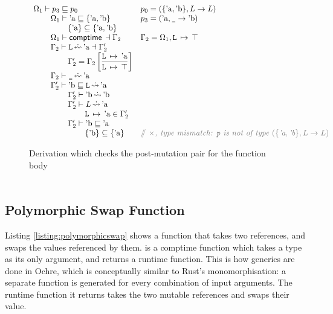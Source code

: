 \documentclass[12pt,twoside]{report}
\begin{document}
\begin{figure}
  \[\begin{array}{ll}
    \Omega_1 \vdash p_3 \subtype p_0 &
      p_0 = (\{\atom{a}, \atom{b}\}, L \rightarrow L) \\
    \otab \Omega_1 \vdash \atom{a} \subtype \{\atom{a}, \atom{b}\} &
      p_3 = (\atom{a}, \mono{\_} \rightarrow \atom{b}) \\
    \otab\otab \{\atom{a}\} \subseteq \{\atom{a}, \atom{b}\} \\
    \otab \Omega_1 \vdash \comptime{} \dashv \Gamma_2 &
      \Gamma_2 = \Omega_1,\absmapm{L}{\top} \\
    \otab \Gamma_2 \vdash \mono{L} \erasedwritearrow \atom{a} \dashv \Gamma_2' \\
    \otab\otab \Gamma_2' = \Gamma_2\left[\dfrac{\absmapm{L}{\atom{a}}}{\absmapm{L}{\top}}\right] \\
    \otab \Gamma_2 \vdash \mono{\_} \erasedwritearrow \atom{a} \\
    \otab \Gamma_2' \vdash \atom{b} \subtype \mono{L} \erasedreadarrow \atom{a} \\
    \otab\otab \Gamma_2' \vdash \atom{b} \erasedreadarrow \atom{b} \\
    \otab\otab \Gamma_2' \vdash L \erasedreadarrow \atom{a} \\
    \otab\otab\otab \absmapm{L}{\atom{a}} \in \Gamma_2' \\
    \otab\otab \Gamma_2' \vdash \atom{b} \subtype \atom{a} \\
    \otab\otab\otab \{\atom{b}\} \subseteq \{\atom{a}\} &
      \ocomment{$\times$, type mismatch: \mono{p} is not of type $(\{\atom{a}, \atom{b}\}, L \rightarrow L)$} \\
  \end{array}\]
  \caption{Derivation which checks the post-mutation pair for the  function body}
  \label{fig:incorrectpairmutation}
\end{figure}

\begin{adjustwidth}{0cm}{0cm}
\smaller
\[\begin{array}{ll}

\end{array}\]
\end{adjustwidth}

\subsection{Polymorphic Swap Function}
Listing \ref{listing:polymorphicswap} shows a function that takes two references, and swaps the values referenced by them.  is a comptime function which takes a type  as its only argument, and returns a runtime function. This is how generics are done in Ochre, which is conceptually similar to Rust's monomorphisation: a separate function is generated for every combination of input arguments. The runtime function it returns takes the two mutable references and swaps their value.
\end{document}
